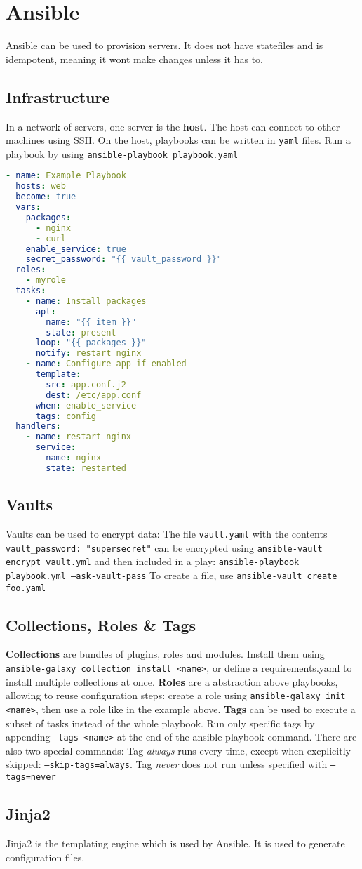 \section{Ansible}
Ansible can be used to provision servers. It does not have statefiles and is idempotent, meaning it wont make changes unless it has to.
\subsection{Infrastructure}
In a network of servers, one server is the \textbf{host}. The host can connect to other machines using SSH. On the host, playbooks can be written in \texttt{yaml} files. Run a playbook by using \texttt{ansible-playbook playbook.yaml}

\begin{lstlisting}[language=yaml]
- name: Example Playbook
  hosts: web
  become: true
  vars:
    packages:
      - nginx
      - curl
    enable_service: true
    secret_password: "{{ vault_password }}"
  roles:
    - myrole
  tasks:
    - name: Install packages
      apt:
        name: "{{ item }}"
        state: present
      loop: "{{ packages }}"
      notify: restart nginx
    - name: Configure app if enabled
      template:
        src: app.conf.j2
        dest: /etc/app.conf
      when: enable_service
      tags: config
  handlers:
    - name: restart nginx
      service:
        name: nginx
        state: restarted
\end{lstlisting}
\subsection{Vaults}
Vaults can be used to encrypt data: The file \texttt{vault.yaml} with the contents \texttt{vault\_password: "supersecret"} can be encrypted using \texttt{ansible-vault encrypt vault.yml} and then included in a play: \texttt{ansible-playbook playbook.yml --ask-vault-pass}
To create a file, use \texttt{ansible-vault create foo.yaml}
\subsection{Collections, Roles \& Tags}
\textbf{Collections} are bundles of plugins, roles and modules. Install them using \texttt{ansible-galaxy collection install <name>}, or define a requirements.yaml to install multiple collections at once.
\textbf{Roles} are a abstraction above playbooks, allowing to reuse configuration steps: create a role using \texttt{ansible-galaxy init <name>}, then use a role like in the example above.
\textbf{Tags} can be used to execute a subset of tasks instead of the whole playbook. Run only specific tags by appending \texttt{--tags <name>} at the end of the ansible-playbook command. There are also two special commands: Tag \textit{always} runs every time, except when excplicitly skipped: \texttt{--skip-tags=always}. Tag \textit{never} does not run unless specified with \texttt{--tags=never}
\subsection{Jinja2}
Jinja2 is the templating engine which is used by Ansible. It is used to generate configuration files.
